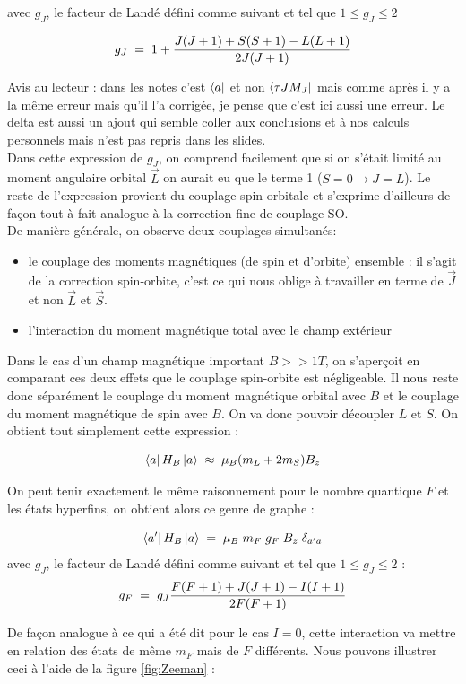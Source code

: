 avec $g_J$, le facteur de Landé défini comme suivant et tel que $1\leq g_J \leq 2$

\[
    g_J \; = \;  1 + \dfrac{J(J+1) + S(S+1) - L(L+1)}{2J(J+1)}
\]

Avis au lecteur : dans les notes c'est $\bra{a}$ et non $\bra{\tau J M_J}$ mais comme après il y a la même erreur mais qu'il l'a corrigée, je pense que c'est ici aussi une erreur. Le delta est aussi un ajout qui semble coller aux conclusions et à nos calculs personnels mais n'est pas repris dans les slides.\\

Dans cette expression de $g_J$, on comprend facilement que si on s'était limité au moment angulaire orbital $\vec{L}$ on aurait eu que le terme 1 ($S=0 \rightarrow J=L$). Le reste de l'expression provient du couplage spin-orbitale et s'exprime d'ailleurs de façon tout à fait analogue à la correction fine de couplage SO.\\

De manière générale, on observe deux couplages simultanés:
\begin{itemize}[label=$\bullet$]
    \item le couplage des moments magnétiques (de spin et d'orbite) ensemble : il s'agit de la correction spin-orbite, c'est ce qui nous oblige à travailler en terme de $\vec{J}$ et non $\vec{L}$ et $\vec{S}$.
    \item l'interaction du moment magnétique total avec le champ extérieur
\end{itemize}
Dans le cas d'un champ magnétique important $B>>1T$, on s'aperçoit en comparant ces deux effets que le couplage spin-orbite est négligeable. Il nous reste donc séparément le couplage du moment magnétique orbital avec $B$ et le couplage du moment magnétique de spin avec $B$. On va donc pouvoir découpler $L$ et $S$. On obtient tout simplement cette expression :

\[
    \bra{a}H_B\ket{a} \; \approx \; \mu_B(m_L + 2m_S)B_z
\]

On peut tenir exactement le même raisonnement pour le nombre quantique $F$ et les états hyperfins, on obtient alors ce genre de graphe :

\[
    \bra{a'}H_B\ket{a} \; = \; \mu_B \; m_F \; g_F \; B_z \;\delta_{a'a}
\]
avec $g_J$, le facteur de Landé défini comme suivant et tel que $1\leq g_J \leq 2$ :
\[
    g_F \; = \;  g_J \dfrac{F(F+1) + J(J+1) - I(I+1)}{2F(F+1)} 
\]


De façon analogue à ce qui a été dit pour le cas $I=0$, cette interaction va mettre en relation des états de même $m_F$ mais de $F$ différents. Nous pouvons illustrer ceci à l'aide de la figure \eqref{fig:Zeeman} :\\

